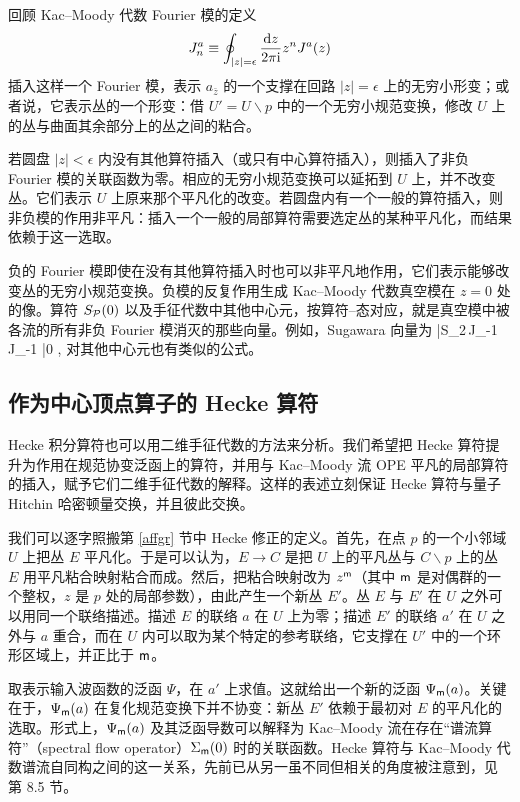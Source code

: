 回顾 Kac--Moody 代数 Fourier 模的定义
\begin{equation}
J^a_n \equiv \oint_{|z|=\epsilon} \frac{{\mathrm d} z}{2 \pi {\mathrm i}} z^n J^a(z)
\end{equation}
插入这样一个 Fourier 模，表示 $a_{\bar z}$ 的一个支撑在回路 $|z|=\epsilon$ 上的无穷小形变；或者说，它表示丛的一个形变：借 $U'=U\backslash p$ 中的一个无穷小规范变换，修改 $U$ 上的丛与曲面其余部分上的丛之间的粘合。

若圆盘 $|z|<\epsilon$ 内没有其他算符插入（或只有中心算符插入），则插入了非负 Fourier 模的关联函数为零。相应的无穷小规范变换可以延拓到 $U$ 上，并不改变丛。它们表示 $U$ 上原来那个平凡化的改变。若圆盘内有一个一般的算符插入，则非负模的作用非平凡：插入一个一般的局部算符需要选定丛的某种平凡化，而结果依赖于这一选取。

负的 Fourier 模即使在没有其他算符插入时也可以非平凡地作用，它们表示能够改变丛的无穷小规范变换。负模的反复作用生成 Kac--Moody 代数真空模在 $z=0$ 处的像。算符 $S_{\cal P}(0)$ 以及手征代数中其他中心元，按算符–态对应，就是真空模中被各流的所有非负 Fourier 模消灭的那些向量。例如，Sugawara 向量为
\be
|S_2\rangle \equiv \Tr \,J_{-1} J_{-1} |0 \rangle,
\ee 对其他中心元也有类似的公式。

\subsection{作为中心顶点算子的 Hecke 算符}\label{cvo}

Hecke 积分算符也可以用二维手征代数的方法来分析。我们希望把 Hecke 算符提升为作用在规范协变泛函上的算符，并用与 Kac--Moody 流 OPE 平凡的局部算符的插入，赋予它们二维手征代数的解释。这样的表述立刻保证 Hecke 算符与量子 Hitchin 哈密顿量交换，并且彼此交换。

我们可以逐字照搬第 \ref{affgr} 节中 Hecke 修正的定义。首先，在点 $p$ 的一个小邻域 $U$ 上把丛 $E$ 平凡化。于是可以认为，$E\to C$ 是把 $U$ 上的平凡丛与 $C\backslash p$ 上的丛 $E$ 用平凡粘合映射粘合而成。然后，把粘合映射改为 $z^{\sf m}$（其中 ${\sf m}$ 是对偶群的一个整权，$z$ 是 $p$ 处的局部参数），由此产生一个新丛 $E'$。丛 $E$ 与 $E'$ 在 $U$ 之外可以用同一个联络描述。描述 $E$ 的联络 $a$ 在 $U$ 上为零；描述 $E'$ 的联络 $a'$ 在 $U$ 之外与 $a$ 重合，而在 $U$ 内可以取为某个特定的参考联络，它支撑在 $U'$ 中的一个环形区域上，并正比于 ${\sf m}$。

取表示输入波函数的泛函 $\Psi$，在 $a'$ 上求值。这就给出一个新的泛函 $\Psi_{{\sf m}}(a)$。关键在于，$\Psi_{\sf m}(a)$ 在复化规范变换下并不协变：新丛 $E'$ 依赖于最初对 $E$ 的平凡化的选取。形式上，$\Psi_{\sf m}(a)$ 及其泛函导数可以解释为 Kac--Moody 流在存在“谱流算符”（spectral flow operator）$\Sigma_{{\sf m}}(0)$ 时的关联函数。Hecke 算符与 Kac--Moody 代数谱流自同构之间的这一关系，先前已从另一虽不同但相关的角度被注意到，见 \cite{Teschner:2010je} 第 8.5 节。

